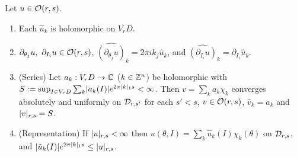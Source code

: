 \begin{lemma}\label{bpN:p4:coefficients}
Let $u\in\mathcal O(r,s)$.
\begin{enumerate}[label=(\alph*)]
\item Each $\hat u_k$ is holomorphic on $V_rD$.
\item $\partial_{\theta_j}u,\ \partial_{I_i}u\in\Os rs$, $\widehat{(\partial_{\theta_j}u)}_k=2\pi ik_j\hat u_k$, and $\widehat{(\partial_{I_i}u)}_k=\partial_{I_i}\hat u_k$.
\item (Series) Let $a_k:V_rD\to\mathbb{C}$ ($k\in\mathbb{Z}^n$) be holomorphic with $S:=\sup_{I\in V_rD}\sum_k\lvert a_k(I)\rvert e^{2\pi\lvert k\rvert_1s}<\infty$. Then $v=\sum_ka_k\chi_k$ converges absolutely and uniformly on $\mathcal D_{r,s'}$ for each $s'<s$, $v\in\mathcal O(r,s)$,
  $\hat v_k=a_k$ and $\lvert v\rvert_{r,s}=S$.
\item (Representation) If $\lvert u\rvert_{r,s}<\infty$ then $u(\theta,I)=\sum_k\hat u_k(I)\chi_k(\theta)$ on $\mathcal D_{r,s}$, and $\lvert \hat u_k(I)\rvert e^{2\pi\lvert k\rvert_1s}\le\lvert u\rvert_{r,s}$.
\end{enumerate}
\end{lemma}
